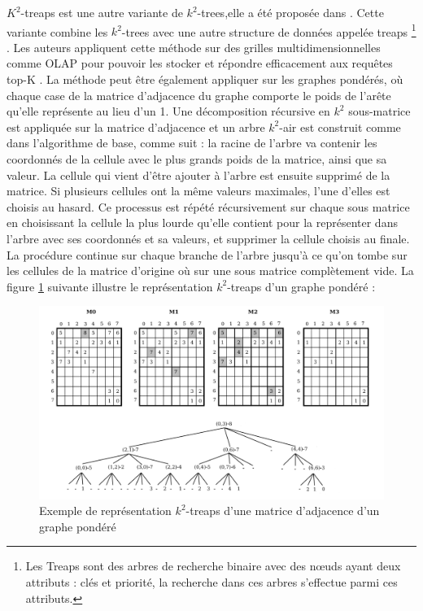 $K^2$-treaps est une autre variante de $k^2$-trees,elle a été proposée dans \citep{brisaboa2014k}. Cette variante combine les $k^2$-trees avec une autre structure de données appelée treaps \footnote{Les Treaps sont des arbres de recherche binaire avec des nœuds ayant deux attributs : clés et priorité, la recherche dans ces arbres s'effectue parmi ces attributs.} \citep{aragon1989randomized}. Les auteurs appliquent cette méthode sur des grilles multidimensionnelles comme OLAP pour pouvoir les stocker et répondre efficacement aux requêtes top-K \citep{badr2013traitement}. La méthode peut être également appliquer sur les graphes pondérés, où chaque case de la matrice d'adjacence du graphe comporte le poids de l'arête qu'elle représente au lieu d'un 1.
Une décomposition récursive en $k^2$ sous-matrice est appliquée sur la matrice d'adjacence et un arbre $k^2$-air est construit comme dans l'algorithme de base, comme suit : la racine de l'arbre va contenir les coordonnés de la cellule avec le plus grands poids de la matrice, ainsi que sa valeur. La cellule qui vient d'être ajouter à l'arbre est ensuite supprimé de la matrice. Si plusieurs cellules ont la même valeurs maximales, l'une d'elles est choisis au hasard. Ce processus est répété récursivement sur chaque sous matrice en choisissant la cellule la plus lourde qu'elle contient pour la représenter dans l'arbre avec ses coordonnés et sa valeurs, et supprimer la cellule choisis au finale. La procédure continue sur chaque branche de l'arbre jusqu'à ce qu'on tombe sur les cellules de la matrice d'origine où sur une sous matrice complètement vide.
La figure \ref{k2-treaps} suivante illustre le représentation $k^2$-treaps d'un graphe pondéré \citep{badr2013traitement} :

\begin{figure}[H]
\begin{center}
\includegraphics[height=200 pt, width=380 pt]{./ressources/image/k2-treaps.png} 
\end{center}
\caption{Exemple de représentation $k^2$-treaps d'une matrice d'adjacence d'un graphe pondéré}
\label{k2-treaps}
\end{figure}

